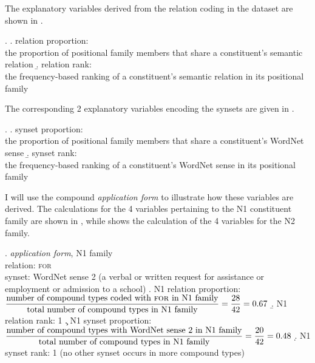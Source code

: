 The explanatory variables derived from the relation coding in the
dataset are shown in \Next.

\ex. 
\a. relation proportion:\\
the proportion of positional family members that share a con\-stit\-u\-ent’s semantic relation
\b. relation rank:\\ %
the frequency-based ranking of a constituent’s semantic relation in its positional family
 
The corresponding 2 explanatory variables encoding the synsets are
given in \Next.

\ex.
\a. synset proportion:\\
    the proportion of positional family members that share a con\-stit\-u\-ent’s WordNet sense
\b. synset rank:\\
    the frequency-based ranking of a constituent’s WordNet sense in its positional family

I will use the compound \emph{application form} to illustrate how
these variables are derived. The calculations for the 4 variables
pertaining to the N1 constituent family are shown in \Next, while
\NNext shows the calculation of the 4 variables for the N2 family. 

\ex. \emph{application form}, N1 family\\
relation: \textsc{for}\\
synset: WordNet sense 2 ({a verbal or written request for assistance or employment or admission to a school})
\a. N1 relation proportion:\\[.5em] 
\( \displaystyle \frac{\text{number of compound types coded with
\textsc{for} in N1 family}}{\text{total number of compound types in
N1 family}}\\[.1em] = \frac{28}{42} = 0.67 \) \vspace*{.3em}
\b. N1 relation rank: 1
\c. N1 synset proportion:\\[.5em]
\( \displaystyle \frac{\text{number of compound types with WordNet sense 2 in N1 family}}{\text{total number of compound types in
N1 family}}\\[.1em] = \frac{20}{42} = 0.48 \)  \vspace*{.3em}
\d. N1 synset rank: 1 (no other synset occurs in more
compound types)

%
%     

